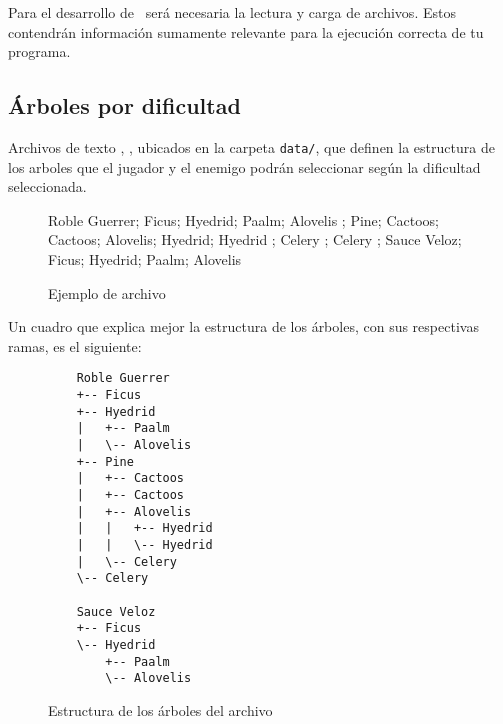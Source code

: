 \label{sec:archivos}
Para el desarrollo de \programa\ será necesaria la lectura y carga de archivos. Estos contendrán información sumamente relevante para la ejecución correcta de tu programa.

\subsection{Árboles por dificultad}
Archivos de texto \texttt{}, \texttt{}, \texttt{} 
ubicados en la carpeta \texttt{data/}, que definen la estructura de los arboles que el jugador y el enemigo podrán seleccionar según la dificultad seleccionada.

\begin{figure}[H]
    \centering
    \begin{minipage}{0.8\textwidth}
        \begin{python}
{
    Roble Guerrer;
    Ficus;
    {
        Hyedrid;
        Paalm;
        Alovelis
    };
    {
        Pine;
        Cactoos;
        Cactoos;
        {
            Alovelis;
            Hyedrid;
            Hyedrid
        };
        Celery
    };
    Celery
};
{
    Sauce Veloz;
    Ficus;
    {
        Hyedrid;
        Paalm;
        Alovelis
    }
}
        \end{python}
        \caption{Ejemplo de archivo }
        \label{fig:facil}
    \end{minipage}
\end{figure}


Un cuadro que explica mejor la estructura de los árboles, con sus respectivas ramas, es el siguiente:


\begin{figure}[H]
    \centering
    \begin{minipage}{0.8\textwidth}
        \begin{verbatim}
    Roble Guerrer
    +-- Ficus
    +-- Hyedrid
    |   +-- Paalm
    |   \-- Alovelis
    +-- Pine
    |   +-- Cactoos
    |   +-- Cactoos
    |   +-- Alovelis
    |   |   +-- Hyedrid
    |   |   \-- Hyedrid
    |   \-- Celery
    \-- Celery
    
    Sauce Veloz
    +-- Ficus
    \-- Hyedrid
        +-- Paalm
        \-- Alovelis
        \end{verbatim}
        \caption{Estructura de los árboles del archivo }
        \label{fig:ramas}
    \end{minipage}
\end{figure}

